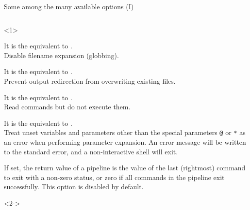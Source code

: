 \begin{frame}{Some among the many available options (I)}
    \vspace{-8mm}
    \begin{columns}
        \begin{column}{\dimexpr\paperwidth-10mm}
            \begin{onlyenv}<1>
                \begin{description}
                    \setlength{\itemsep}{3mm}
                    \item[\PB{\texttt{-o noglob}}]
                        It is the equivalent to .\\
                        Disable filename expansion (globbing).
                    \item[\PB{\texttt{-o noclobber}}]
                        It is the equivalent to .\\
                        Prevent output redirection from overwriting existing files.
                    \item[\PB{\texttt{-o noexec}}]
                        It is the equivalent to .\\
                        Read commands but do not execute them. 
                    \item[\PB{\texttt{-o nounset}}]
                        It is the equivalent to .\\
                        Treat unset variables and parameters other than the special parameters \texttt{@} or \texttt{*} as an error when performing parameter expansion.
                        An error message will be written to the standard error, and a non-interactive shell will exit.
                    \item[\PB{\texttt{-o pipefail}}]
                        If set, the return value of a pipeline is the value of the last (rightmost) command to exit with a non-zero status, or zero if all commands in the pipeline exit successfully.
                        This option is disabled by default.
                \end{description}
            \end{onlyenv}
            \begin{onlyenv}<2->
                \begin{description}
                    \item[\PB{\texttt{-o errexit}}]

\end{description}
\end{onlyenv}
\end{column}
\end{columns}
\end{frame}
